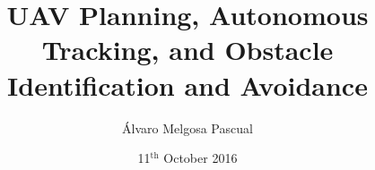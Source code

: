 \documentclass[9pt]{beamer}
\title[UAV Planning, Autonomous Tracking, and Obstacle Identification and Avoidance]{\Huge UAV Planning, Autonomous Tracking, and Obstacle Identification and Avoidance}
\author{Álvaro Melgosa Pascual} %
\institute[UC3M]{Universidad Carlos III Madrid, Leganés}
\date{ 11$^\text{th}$ October 2016} %
\begin{document}
\begin{frame}
	\titlepage
\end{frame}

\begin{frame}
	
\end{frame}
\end{document}
